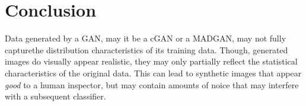 \section{Conclusion}\label{conclusion}

Data generated by a GAN, may it be a cGAN or a MADGAN, may not fully capturethe distribution characteristics of its training data. Though, generated images do visually appear realistic, they may only partially reflect the statistical characteristics of the original data. This can lead to synthetic images that appear \textit{good} to a human inspector, but may contain amounts of noice that may interfere with a subsequent classifier. 